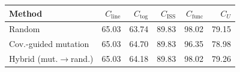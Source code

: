 \begin{tabular}{@{}l r r r r r@{}}\toprule
Method & $C_{\mathrm{line}}$ & $C_{\mathrm{tog}}$ & $C_{\mathrm{ISS}}$ & $C_{\mathrm{func}}$ & $C_U$\\\midrule
Random & 65.03 & 63.74 & 89.83 & 98.02 & 79.15\\
Cov.-guided mutation & 65.03 & 64.70 & 89.83 & 96.35 & 78.98\\
Hybrid (mut.$\rightarrow$rand.) & 65.03 & 64.18 & 89.83 & 98.02 & 79.26\\
\bottomrule\end{tabular}